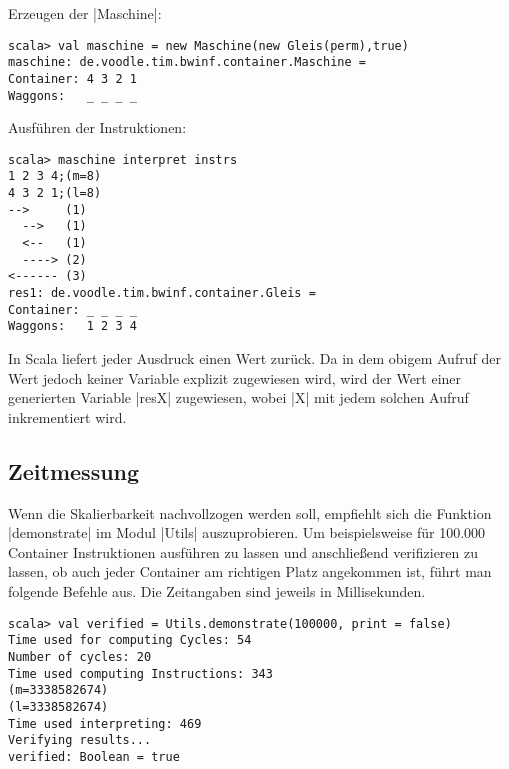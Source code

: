  Erzeugen der |Maschine|:
\begin{lstlisting}
scala> val maschine = new Maschine(new Gleis(perm),true)
maschine: de.voodle.tim.bwinf.container.Maschine = 
Container: 4 3 2 1
Waggons:   _ _ _ _
\end{lstlisting}
Ausführen der Instruktionen:
\begin{lstlisting}
scala> maschine interpret instrs
1 2 3 4;(m=8)
4 3 2 1;(l=8)
-->     (1)
  -->   (1)
  <--   (1)
  ----> (2)
<------ (3)
res1: de.voodle.tim.bwinf.container.Gleis = 
Container: _ _ _ _
Waggons:   1 2 3 4
\end{lstlisting}
In Scala liefert jeder Ausdruck einen Wert zurück. Da in dem obigem Aufruf der Wert jedoch keiner Variable explizit zugewiesen wird,
 wird der Wert einer generierten Variable |resX| zugewiesen, wobei |X| mit jedem solchen Aufruf inkrementiert wird.

\subsection{Zeitmessung}
Wenn die Skalierbarkeit nachvollzogen werden soll,
empfiehlt sich die Funktion |demonstrate| im Modul |Utils| auszuprobieren.
Um beispielsweise für 100.000 Container Instruktionen ausführen zu lassen und anschließend verifizieren zu lassen,
ob auch jeder Container am richtigen Platz angekommen ist, führt man folgende Befehle aus.
Die Zeitangaben sind jeweils in Millisekunden.
\begin{lstlisting}
scala> val verified = Utils.demonstrate(100000, print = false)
Time used for computing Cycles: 54
Number of cycles: 20
Time used computing Instructions: 343
(m=3338582674)
(l=3338582674)
Time used interpreting: 469
Verifying results...
verified: Boolean = true
\end{lstlisting}

\lstset{xleftmargin=-.8cm,xrightmargin=-.8cm}
\lstset{basicstyle=\ttfamily\small}
\clearpage
